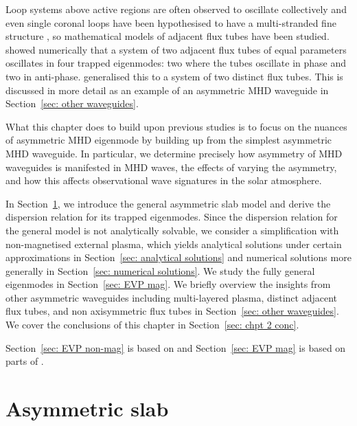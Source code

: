 \documentclass[12pt,draft]{../style-files/ociamthesis}
\begin{document}
Loop systems above active regions are often observed to oscillate collectively and even single coronal loops have been hypothesised to have a multi-stranded fine structure \citep{asc_etal00}, so mathematical models of adjacent flux tubes have been studied. \cite{lun_etal08} showed numerically that a system of two adjacent flux tubes of equal parameters oscillates in four trapped eigenmodes: two where the tubes oscillate in phase and two in anti-phase. \cite{van_etal08} generalised this to a system of two distinct flux tubes. This is discussed in more detail as an example of an asymmetric MHD waveguide in Section~\ref{sec: other waveguides}.

What this chapter does to build upon previous studies is to focus on the nuances of asymmetric MHD eigenmode by building up from the simplest asymmetric MHD waveguide. In particular, we determine precisely how asymmetry of MHD waveguides is manifested in MHD waves, the effects of varying the asymmetry, and how this affects observational wave signatures in the solar atmosphere.

In Section~\ref{sec: EVP asym slab}, we introduce the general asymmetric slab model and derive the dispersion relation for its trapped eigenmodes. Since the  dispersion relation for the general model is not analytically solvable, we consider a simplification with non-magnetised external plasma, which yields analytical solutions under certain approximations in Section~\ref{sec: analytical solutions} and numerical solutions more generally in Section~\ref{sec: numerical solutions}. We study the fully general eigenmodes in Section~\ref{sec: EVP mag}. We briefly overview the insights from other asymmetric waveguides including multi-layered plasma, distinct adjacent flux tubes, and non axisymmetric flux tubes in Section~\ref{sec: other waveguides}. We cover the conclusions of this chapter in Section~\ref{sec: chpt 2 conc}.

Section~\ref{sec: EVP non-mag} is based on \cite{all_etal17} and Section~\ref{sec: EVP mag} is based on parts of \cite{zsa_etal18}.

\section{Asymmetric slab}
\label{sec: EVP asym slab}
\end{document}
